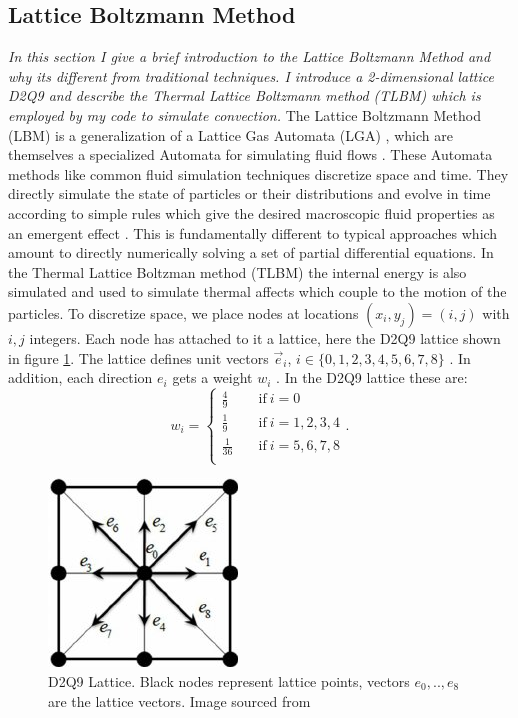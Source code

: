 \documentclass{article}
\begin{document}
\subsection*{Lattice Boltzmann Method}
{\it{In this section I give a brief introduction to the Lattice Boltzmann Method and why its different from traditional techniques. I introduce a 2-dimensional lattice D2Q9 and describe the Thermal Lattice Boltzmann method (TLBM) which is employed by my code to simulate convection.}}
\vspace{0.3cm}
\newline
\noindent The Lattice Boltzmann Method (LBM) is a generalization of a Lattice Gas Automata (LGA) , which are themselves a 
specialized Automata for simulating fluid flows \cite{rothman2004lattice}. These Automata methods like common fluid simulation techniques 
discretize space and time. They directly simulate the state of particles or their distributions and evolve in time 
according to simple rules which give the desired macroscopic fluid properties as an emergent effect \cite{wagner2008practical}. This is fundamentally 
different to typical approaches which amount to directly numerically solving a set of partial differential equations. In the Thermal Lattice Boltzman method (TLBM) the internal energy is also simulated and used to simulate thermal affects which couple to the motion of the particles.
\newline
\noindent To discretize space, we place nodes at locations $(x_i,y_j)=(i,j)$ with $i,j$ integers. Each node has attached to it a lattice, here the D2Q9 lattice shown in figure \ref{D2Q9}. The lattice defines unit vectors $\vec{e}_i$, $i \in \{ 0,1,2,3,4,5,6,7,8 \}$ \cite{mora2017simulation}. In addition, each direction $e_i$ gets a weight $w_i$ \cite{mora2017simulation}. In the D2Q9 lattice these are:
\begin{equation*}
w_i = \begin{cases}
          \frac{4}{9} \quad &\text{if}  \ i=0 \\
          \frac{1}{9} \quad &\text{if} \ i=1,2,3,4 \\
          \frac{1}{36} \quad &\text{if} \ i=5,6,7,8 \\
     \end{cases}.
\end{equation*}
\begin{figure}[h!]
	\centering
	\includegraphics{D2Q9Lattice.jpg}
	\caption{D2Q9 Lattice. Black nodes represent lattice points, vectors $e_0,..,e_8$ are the lattice vectors. Image sourced from \cite{khazaeli2015ghost}}
	\label{D2Q9}
\end{figure}
\end{document}
